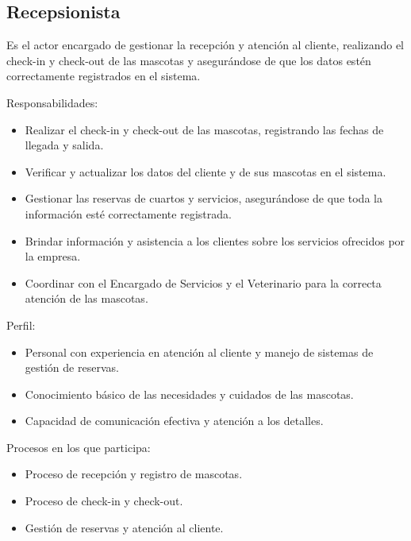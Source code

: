 \begin{Usuario}{\hypertarget{Recepcionista}{\subsection{Recepsionista}}}{
			Es el actor encargado de gestionar la recepción y atención al cliente, realizando el check-in y check-out de las mascotas y asegurándose de que los datos estén correctamente registrados en el sistema.
		}
		\item[Responsabilidades:] \cdtEmpty
		\begin{itemize}
			\item Realizar el check-in y check-out de las mascotas, registrando las fechas de llegada y salida.
\item Verificar y actualizar los datos del cliente y de sus mascotas en el sistema.
\item Gestionar las reservas de cuartos y servicios, asegurándose de que toda la información esté correctamente registrada.
\item Brindar información y asistencia a los clientes sobre los servicios ofrecidos por la empresa.
\item Coordinar con el Encargado de Servicios y el Veterinario para la correcta atención de las mascotas.
		\end{itemize}
		
		\item[Perfil:] \cdtEmpty
		\begin{itemize}
			\item Personal con experiencia en atención al cliente y manejo de sistemas de gestión de reservas.
		\item Conocimiento básico de las necesidades y cuidados de las mascotas.
		\item Capacidad de comunicación efectiva y atención a los detalles.
		\end{itemize}
		\item[Procesos en los que participa:] \cdtEmpty
		\begin{itemize}
			\item Proceso de recepción y registro de mascotas.
		\item Proceso de check-in y check-out.
		\item Gestión de reservas y atención al cliente.
		\end{itemize}
	\end{Usuario}

